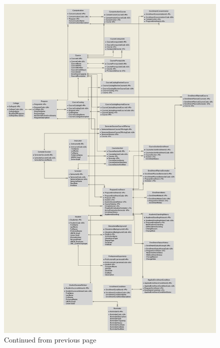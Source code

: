 \documentclass[12pt]{article}
\begin{document}
\begin{appendices}
    \begin{figure}[ht]
        \ContinuedFloat
        \centering
            \includegraphics[trim={0 0 0 25cm},clip,width=\textwidth]{entity-relationship-diagram-with-attr}
        \caption{Continued from previous page}
        \label{fig:entity-relationship-diagram-with-attr2}
    \end{figure}
    \restoregeometry


\end{appendices}
\end{document}
